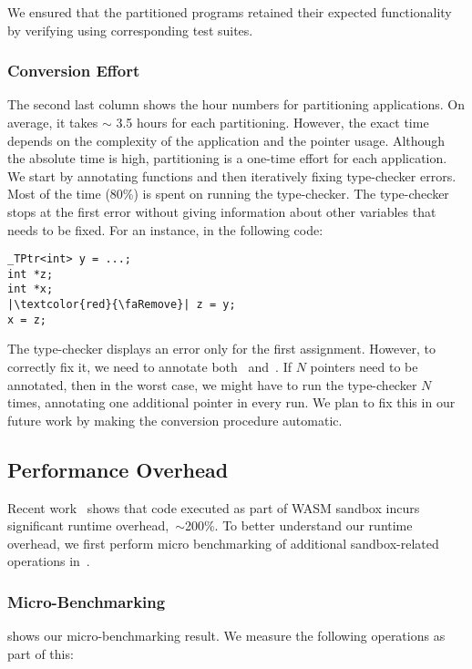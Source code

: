We ensured that the partitioned programs retained their expected functionality by verifying using corresponding test suites.

\subsubsection{Conversion Effort}
The second last column shows the hour numbers for partitioning applications.
On average, it takes $\sim$ 3.5 hours for each partitioning. However, the exact time depends on the complexity of the application and the pointer usage.
Although the absolute time is high, partitioning is a one-time effort for each application.
We start by annotating functions and then iteratively fixing type-checker errors.
Most of the time (80\%) is spent on running the type-checker.
The type-checker stops at the first error without giving information about other variables that needs to be fixed. 
For an instance, in the following code:
\begin{verbatim}
_TPtr<int> y = ...; 
int *z;
int *x;
|\textcolor{red}{\faRemove}| z = y;
x = z;
\end{verbatim}
The type-checker displays an error only for the first assignment.
However, to correctly fix it, we need to annotate both~ and~.
If $N$ pointers need to be annotated, then in the worst case, we might have to run the type-checker $N$ times, annotating one additional pointer in every run.
We plan to fix this in our future work by making the conversion procedure automatic.

\subsection{Performance Overhead}
Recent work~\cite{jangda2019not} shows that code executed as part of WASM sandbox incurs significant runtime overhead,~\ie$\sim$200\%.
To better understand our runtime overhead, we first perform micro benchmarking of additional sandbox-related operations in~\systemname{}.

\subsubsection{Micro-Benchmarking}
 shows our micro-benchmarking result.
We measure the following operations as part of this:

